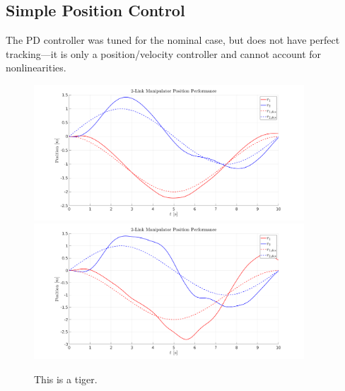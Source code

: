 \documentclass[letterpaper, 10 pt, conference]{ieeeconf}  %
\begin{document}
\subsection{Simple Position Control}

The PD controller was tuned for the nominal case, but does not have perfect tracking---it is only a position/velocity controller and cannot account for nonlinearities.

\begin{figure}[h!]
	\centering
	\includegraphics[width=0.9\textwidth]{pd_pos_1.png}
	\includegraphics[width=0.9\textwidth]{pd_pos_2.png}\\
	\caption{This is a tiger.}
\end{figure}
\end{document}
